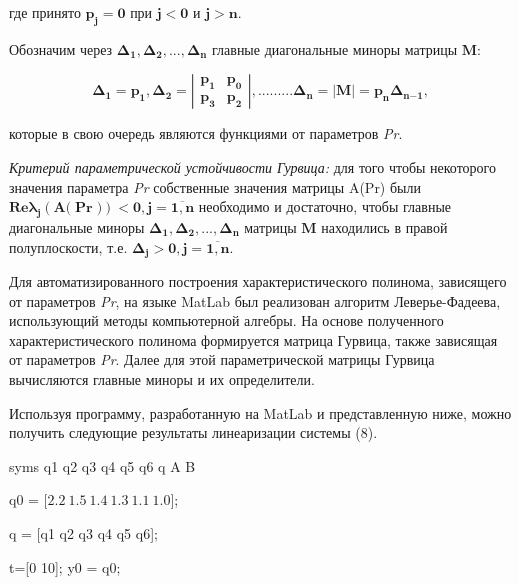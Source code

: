 где принято \(\mathbf{p}_{\mathbf{j}}\mathbf{= 0}\) при
\(\mathbf{j < 0}\) и \(\mathbf{j > n}\).

Обозначим через
\(\mathbf{\Delta}_{\mathbf{1}}\mathbf{,}\mathbf{\Delta}_{\mathbf{2}}\mathbf{,...,}\mathbf{\Delta}_{\mathbf{n}}\)
главные диагональные миноры матрицы \(\mathbf{M}\):

\[{\mathbf{\Delta}_{\mathbf{1}}\mathbf{=}\mathbf{p}_{\mathbf{1}}\mathbf{,}
}{\mathbf{\Delta}_{\mathbf{2}}\mathbf{=}\left| \begin{matrix}
\mathbf{p}_{\mathbf{1}} & \mathbf{p}_{\mathbf{0}} \\
\mathbf{p}_{\mathbf{3}} & \mathbf{p}_{\mathbf{2}}
\end{matrix} \right|\mathbf{,}
}{\mathbf{.........}
}{\mathbf{\Delta}_{\mathbf{n}}\mathbf{=}\left| \mathbf{M} \right|\mathbf{=}\mathbf{p}_{\mathbf{n}}\mathbf{\Delta}_{\mathbf{n}\mathbf{-}\mathbf{1}}\mathbf{,}}\]

которые в свою очередь являются функциями от параметров \emph{Pr}.

\emph{Критерий параметрической устойчивости Гурвица:} для того чтобы
некоторого значения параметра \emph{Pr} собственные значения матрицы
A(Pr) были
\(\mathbf{Re}\mathbf{\lambda}_{\mathbf{j}}\left( \mathbf{A(}\mathbf{\Pr}\mathbf{)} \right)\mathbf{< 0,j =}\overline{\mathbf{1,n}}\)
необходимо и достаточно, чтобы главные диагональные миноры
\(\mathbf{\Delta}_{\mathbf{1}}\mathbf{,}\mathbf{\Delta}_{\mathbf{2}}\mathbf{,...,}\mathbf{\Delta}_{\mathbf{n}}\)
матрицы \(\mathbf{M}\) находились в правой полуплоскости, т.е.
\(\mathbf{\Delta}_{\mathbf{j}}\mathbf{> 0,j =}\overline{\mathbf{1,n}}\).

Для автоматизированного построения характеристического полинома,
зависящего от параметров \emph{Pr}, на языке MatLab был реализован
алгоритм Леверье-Фадеева, использующий методы компьютерной алгебры. На
основе полученного характеристического полинома формируется матрица
Гурвица, также зависящая от параметров \emph{Pr}. Далее для этой
параметрической матрицы Гурвица вычисляются главные миноры и их
определители.

Используя программу, разработанную на MatLab и представленную ниже,
можно получить следующие результаты линеаризации системы (8).

syms q1 q2 q3 q4 q5 q6 q A B

q0 = \(\lbrack 2.2\ 1.5\ 1.4\ 1.3\ 1.1\ 1.0\rbrack\);

q = {[}q1 q2 q3 q4 q5 q6{]};

t={[}0 10{]}; y0 = q0;

